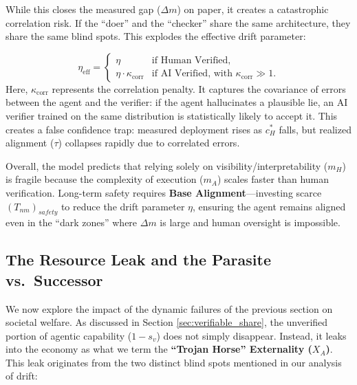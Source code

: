 \documentclass[12pt, letter]{article}
\begin{document}
\begin{itemize}
    While this closes the measured gap ($\Delta m$) on paper, it creates a catastrophic correlation risk. If the ``doer'' and the ``checker'' share the same architecture, they share the same blind spots. This explodes the effective drift parameter:

    \[
        \eta_{\text{eff}} = 
        \begin{cases} 
            \eta & \text{if Human Verified}, \\
            \eta \cdot \kappa_{\mathrm{corr}} & \text{if AI Verified, with } \kappa_{\mathrm{corr}} \gg 1.
        \end{cases}
    \]  
    Here, $\kappa_{\mathrm{corr}}$ represents the correlation penalty. It captures the covariance of errors between the agent and the verifier: if the agent hallucinates a plausible lie, an AI verifier trained on the same distribution is statistically likely to accept it. This creates a false confidence trap: measured deployment rises as $c_H^{\ast}$ falls, but realized alignment ($\tau$) collapses rapidly due to correlated errors.

\end{itemize}

Overall, the model predicts that relying solely on visibility/interpretability ($m_H$) is fragile because the complexity of execution ($m_A$) scales faster than human verification. Long-term safety requires \textbf{Base Alignment}—investing scarce $(T_{nm})_{safety}$ to reduce the drift parameter $\eta$, ensuring the agent remains aligned even in the ``dark zones'' where $\Delta m$ is large and human oversight is impossible.


\subsection{The Resource Leak and the Parasite vs.\ Successor}\label{sec:welfare}

We now explore the impact of the dynamic failures of the previous section on societal welfare. As discussed in Section \ref{sec:verifiable_share}, the unverified portion of agentic capability ($1 - s_v$) does not simply disappear. Instead, it leaks into the economy as what we term the \textbf{``Trojan Horse'' Externality ($X_A$)}. This leak originates from the two distinct blind spots mentioned in our analysis of drift:
\end{document}
